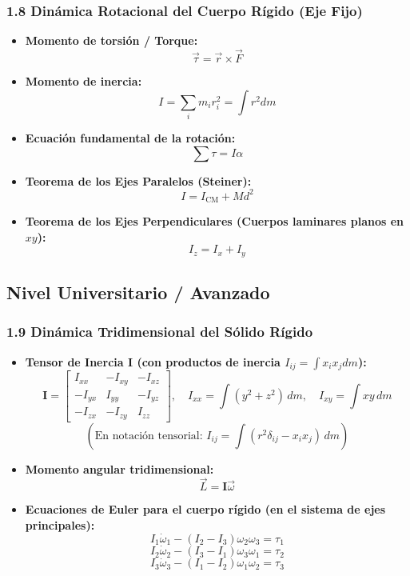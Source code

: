 \documentclass[11pt,a4paper]{article}
\begin{document}
\subsubsection*{1.8 Dinámica Rotacional del Cuerpo Rígido (Eje Fijo)}

\begin{itemize}
  \item \textbf{Momento de torsión / Torque:}
  \[
    \vec{\tau} = \vec{r} \times \vec{F}
  \]
  \item \textbf{Momento de inercia:}
  \[
    I = \sum_i m_i r_i^2 = \int r^2 dm
  \]
  \item \textbf{Ecuación fundamental de la rotación:}
  \[
    \sum \tau = I \alpha
  \]
  \item \textbf{Teorema de los Ejes Paralelos (Steiner):}
  \[
    I = I_{\text{CM}} + M d^2
  \]
  \item \textbf{Teorema de los Ejes Perpendiculares (Cuerpos laminares planos en $xy$):}
  \[
    I_z = I_x + I_y
  \]
\end{itemize}

\subsection*{Nivel Universitario / Avanzado}

\subsubsection*{1.9 Dinámica Tridimensional del Sólido Rígido}

\begin{itemize}
  \item \textbf{Tensor de Inercia $\mathbf{I}$ (con productos de inercia $I_{ij} = \int x_i x_j dm$):}
  \[
    \mathbf{I} = \begin{bmatrix} I_{xx} & -I_{xy} & -I_{xz} \\ -I_{yx} & I_{yy} & -I_{yz} \\ -I_{zx} & -I_{zy} & I_{zz} \end{bmatrix}, \quad I_{xx} = \int (y^2 + z^2) \, dm, \quad I_{xy} = \int xy \, dm
  \]
  \[
    \left( \text{En notación tensorial: } I_{ij} = \int (r^2 \delta_{ij} - x_i x_j) \, dm \right)
  \]
  \item \textbf{Momento angular tridimensional:}
  \[
    \vec{L} = \mathbf{I} \vec{\omega}
  \]
  \item \textbf{Ecuaciones de Euler para el cuerpo rígido (en el sistema de ejes principales):}
  \[
    I_1 \dot{\omega}_1 - (I_2 - I_3)\omega_2 \omega_3 = \tau_1
  \]
  \[
    I_2 \dot{\omega}_2 - (I_3 - I_1)\omega_3 \omega_1 = \tau_2
  \]
  \[
    I_3 \dot{\omega}_3 - (I_1 - I_2)\omega_1 \omega_2 = \tau_3
  \]
\end{itemize}
\end{document}
